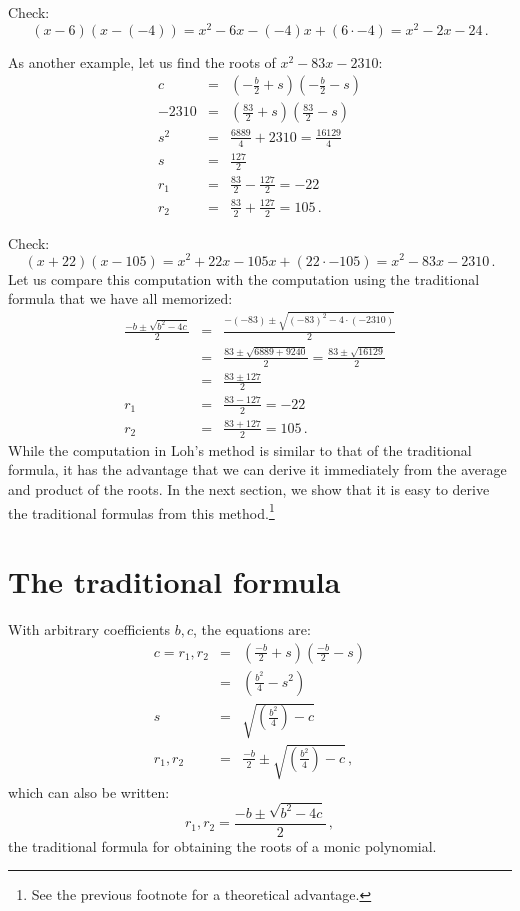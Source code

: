 \documentclass[12pt,a4paper]{article}
\begin{document}
Check:
\[
(x-6)(x-(-4))=x^2-6x-(-4)x+(6\cdot -4)= x^2-2x-24\,.
\]

As another example, let us find the roots of $x^2-83x-2310$:
\begin{eqnarray*}
c&=&\left(-\frac{b}{2} +s\right)\left(-\frac{b}{2} -s\right)\\
-2310&=&\left(\frac{83}{2}+s\right)\left(\frac{83}{2} -s\right)\\
s^2&=&\frac{6889}{4}+2310=\frac{16129}{4}\\
s&=&\frac{127}{2}\\
r_1&=&\frac{83}{2}-\frac{127}{2}=-22\\
r_2&=&\frac{83}{2}+\frac{127}{2}=105\,.
\end{eqnarray*}

Check:
\[
(x+22)(x-105)=x^2+22x-105x+(22\cdot -105)= x^2-83x-2310\,.
\]
Let us compare this computation with the computation using the traditional  formula that we have all memorized:
\begin{eqnarray*}
\frac{-b\pm\sqrt{b^2-4c}}{2}&=&\frac{-(-83)\pm\sqrt{(-83)^2-4\cdot (-2310)}}{2}\\
&=& \frac{83\pm\sqrt{6889+9240}}{2} = \frac{83\pm\sqrt{16129}}{2}\\
&=& \frac{83\pm 127}{2}\\
r_1&=&\frac{83-127}{2}=-22\\
r_2&=&\frac{83+127}{2}=105\,.
\end{eqnarray*}
While the computation in Loh's method is similar to that of the traditional formula, it has the advantage that we can derive it immediately from the average and product of the roots. In the next section, we show that it is easy to derive the traditional formulas from this method.\footnote{See the previous footnote for a theoretical advantage.}

\section{The traditional formula}\label{s.general}

With arbitrary coefficients $b,c$, the equations are:
\begin{eqnarray*}
c=r_1,r_2&=&\left(\frac{-b}{2}+s\right)  \left(\frac{-b}{2}-s\right)\\
&=&\left(\frac{b^2}{4}-s^2\right)\\
s&=&\sqrt{\left(\frac{b^2}{4}\right)-c}\\
r_1,r_2&=&\frac{-b}{2}\pm\sqrt{\left(\frac{b^2}{4}\right)-c}\,,
\end{eqnarray*}
which can also be written:
\[
r_1,r_2=\frac{-b\pm\sqrt{b^2-4c}}{2}\,,
\]
the traditional formula for obtaining the roots of a monic polynomial.
\end{document}
